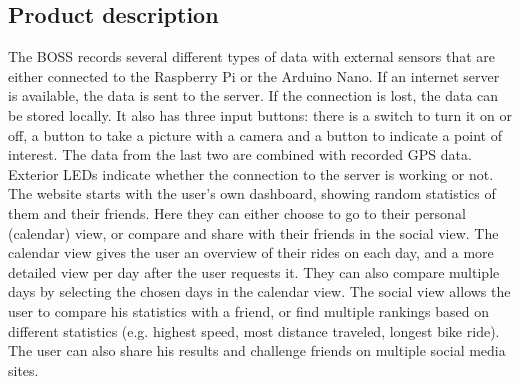\subsection{Product description}
The BOSS records several different types of data with external sensors that are either connected to the Raspberry Pi or the Arduino Nano. 
If an internet server is available, the data is sent to the server. If the connection is lost, the data can be stored locally.
It also has three input buttons: there is a switch to turn it on or off, a button to take a picture with a camera and a button to indicate a point of interest. 
The data from the last two are combined with recorded GPS data. Exterior LEDs indicate whether the connection to the server is working or not.
The website starts with the user’s own dashboard, showing random statistics of them and their friends. 
Here they can either choose to go to their personal (calendar) view, or compare and share with their friends in the social view. 
The calendar view gives the user an overview of their rides on each day, and a more detailed view per day after the user requests it. 
They can also compare multiple days by selecting the chosen days in the calendar view. 
The social view allows the user to compare his statistics with a friend, or find multiple rankings based on different statistics (e.g. highest speed, most distance traveled, longest bike ride).
The user can also share his results and challenge friends on multiple social media sites.
